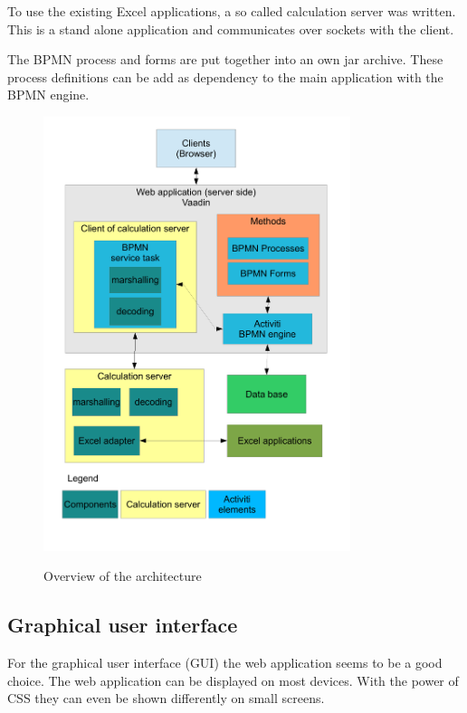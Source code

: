 \documentclass[paper=a4,twoside=false,BCOR=0mm,DIV=calc,fontsize=12pt]{scrartcl}
\begin{document}
To use the existing Excel applications, a so called calculation server was written. This is a stand alone application and communicates over sockets with the client.

The BPMN process and forms are put together into an own jar archive. These process definitions can be add as dependency to the main application with the BPMN engine.


\begin{figure}
    \begin{center}
      \includegraphics[width=0.8\textwidth]{./img/ArchitectrueOverview.pdf}\\
    \end{center}
  \caption{Overview of the architecture}
  \label{architectureoverview}
\end{figure} 

\subsection{Graphical user interface}
For the graphical user interface (GUI) the web application seems to be a good choice. The web application can be displayed on most devices. With the power of CSS \cite{css} they can even be shown differently on small screens.
\end{document}
